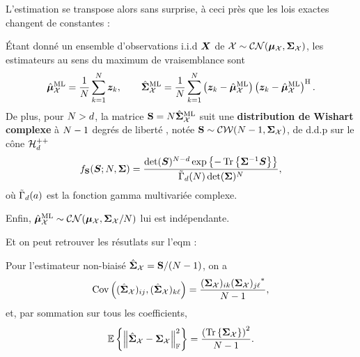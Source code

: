 L'estimation se transpose alors sans surprise, à ceci près que les lois exactes changent de constantes :

\begin{proposition}
\label{prop:context-complex-mle}
  \'Etant donné un ensemble d'observations i.i.d $\boldsymbol{X}$ de $\mathcal{X}\sim\mathcal{CN}(\boldsymbol{\mu}_{\mathcal{X}},\boldsymbol{\Sigma}_{\mathcal{X}})$, les estimateurs au sens du maximum de vraisemblance sont
  \begin{equation}
    \hat{\boldsymbol{\mu}}_{\mathcal{X}}^{\mathrm{ML}} = \frac{1}{N}\sum_{k=1}^{N}\boldsymbol{z}_k,
    \qquad
    \hat{\boldsymbol{\Sigma}}_{\mathcal{X}}^{\mathrm{ML}}
    =
    \frac{1}{N}\sum_{k=1}^{N}
    \left(\boldsymbol{z}_k-\hat{\boldsymbol{\mu}}_{\mathcal{X}}^{\mathrm{ML}}\right)
    \left(\boldsymbol{z}_k-\hat{\boldsymbol{\mu}}_{\mathcal{X}}^{\mathrm{ML}}\right)^{\mathrm{H}}.
    \label{eq:context-complex-mle}
  \end{equation}
  De plus, pour $N>d$, la matrice $\mathbf{S}=N\hat{\boldsymbol{\Sigma}}_{\mathcal{X}}^{\mathrm{ML}}$ suit une \textbf{distribution de Wishart complexe} à $N-1$ degrés de liberté , notée $\mathbf{S}\sim\mathcal{CW}(N-1,\boldsymbol{\Sigma}_{\mathcal{X}})$, de d.d.p sur le cône $\mathcal{H}_{d}^{++}$
  \begin{equation}
    f_{\mathbf{S}}(\boldsymbol{S};N,\boldsymbol{\Sigma})
    =
    \frac{
      \operatorname{\operatorname{det}}(\boldsymbol{S})^{N-d}
      \exp\left\{-\operatorname{\operatorname{Tr}}\left\{{\boldsymbol{\Sigma}}^{-1}\boldsymbol{S}\right\}\right\}
    }{
      \tilde{\Gamma}_d(N)\operatorname{\operatorname{det}}(\boldsymbol{\Sigma})^{N}
    },
    \label{eq:context-complex-cwishart}
  \end{equation}
  où $\tilde{\Gamma}_d(a) $ est la fonction gamma multivariée complexe. 

  Enfin, $\hat{\boldsymbol{\mu}}_{\mathcal{X}}^{\mathrm{ML}}\sim\mathcal{CN}(\boldsymbol{\mu}_{\mathcal{X}},\boldsymbol{\Sigma}_{\mathcal{X}}/N)$ lui est indépendante.
\end{proposition}

Et on peut retrouver les résutlats sur l'eqm :

\begin{proposition}
\label{prop:context-complex-msescm}
  Pour l'estimateur non-biaisé $\hat{\boldsymbol{\Sigma}}_{\mathcal{X}} = \mathbf{S}/(N-1)$, on a
  \begin{equation}
    \operatorname{\operatorname{Cov}}\left(
      (\hat{\boldsymbol{\Sigma}}_{\mathcal{X}})_{ij},
      (\hat{\boldsymbol{\Sigma}}_{\mathcal{X}})_{k\ell}
    \right)
    =
    \frac{(\boldsymbol{\Sigma}_{\mathcal{X}})_{i k}{(\boldsymbol{\Sigma}_{\mathcal{X}})_{j \ell}}^{*}}{N-1},
    \label{eq:context-complex-covscm}
  \end{equation}
  et, par sommation sur tous les coefficients,
  \begin{equation}
    \operatorname{\mathbb{E}}\left\{\left\|\hat{\boldsymbol{\Sigma}}_{\mathcal{X}}-\boldsymbol{\Sigma}_{\mathcal{X}}\right\|_{\mathbb{F}}^2\right\}
    =
    \frac{\left(\operatorname{\operatorname{Tr}}\left\{\boldsymbol{\Sigma}_{\mathcal{X}}\right\}\right)^2}{N-1}.
    \label{eq:context-complex-msescm}
  \end{equation}
\end{proposition}

